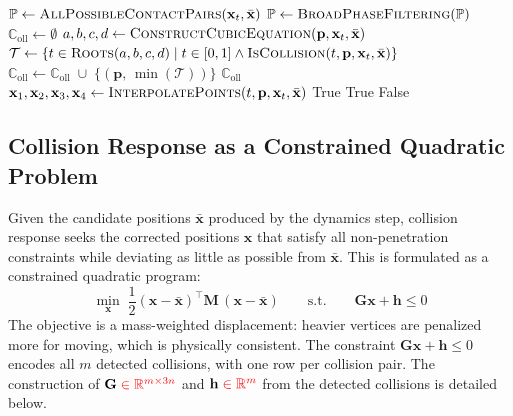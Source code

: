 \documentclass{article}
\newcommand{\red}[1]{\textcolor{red}{#1}}
\begin{document}
\begin{algorithm}[H]
\caption{Continuous Collision Detection: cubic root finding per candidate pair.}
\label{alg:CCD}
\begin{algorithmic}[1]
\addtolength{\itemsep}{0.5ex}
    \State $\mathbb{P} \gets \textsc{AllPossibleContactPairs}(\mathbf{x}_t, \bar{\mathbf{x}})$
    \State $\mathbb{P} \gets \textsc{BroadPhaseFiltering}(\mathbb{P})$
    \State $\mathbb{C}_{\text{oll}} \gets \emptyset$
        \State $a, b, c, d \gets \textsc{ConstructCubicEquation}(\mathbf{p}, \mathbf{x}_t, \bar{\mathbf{x}})$
        \State $\mathcal{T} \gets \{t \in \textsc{Roots}(a,b,c,d)\mid t \in [0, 1] \wedge \textsc{IsCollision}(t, \mathbf{p}, \mathbf{x}_t, \bar{\mathbf{x}})\}$
            \State $\mathbb{C}_{\text{oll}} \gets \mathbb{C}_{\text{oll}}\;\cup\; 
            \{(\mathbf{p},\,\min(\mathcal{T}))\}$
        \EndIf
    \EndFor
    \State \Return $\mathbb{C}_{\text{oll}}$
\EndFunction
\Statex
{}
    \State $\mathbf{x}_1, \mathbf{x}_2, \mathbf{x}_3, \mathbf{x}_4 \gets \textsc{InterpolatePoints}(t, \mathbf{p}, \mathbf{x}_t, \bar{\mathbf{x}})$
        \State \Return True
        \EndIf
        \State \Return True
        \EndIf
    \EndIf
    \State \Return False
\EndFunction
\end{algorithmic}
\end{algorithm}

\subsection{Collision Response as a Constrained Quadratic Problem}

Given the candidate positions $\bar{\mathbf{x}}$ produced by the dynamics step, collision response seeks the corrected positions $\mathbf{x}$ that satisfy all non-penetration constraints while deviating as little as possible from $\bar{\mathbf{x}}$. This is formulated as a constrained quadratic program:
\begin{equation}
    \min_{\mathbf{x}}\; \frac{1}{2}(\mathbf{x} - \bar{\mathbf{x}})^\top \mathbf{M}\, (\mathbf{x} - \bar{\mathbf{x}})
    \qquad 
    \text{s.t.}
    \qquad
    \mathbf{G}\mathbf{x}+\mathbf{h} \leq 0
\end{equation}
The objective is a mass-weighted displacement: heavier vertices are penalized more for moving, which is physically consistent. The constraint $\mathbf{G}\mathbf{x}+\mathbf{h} \leq 0$ encodes all $m$ detected collisions, with one row per collision pair. The construction of $\mathbf{G} \;\red{\in \mathbb{R}^{m \times 3n}}$ and $\mathbf{h} \;\red{\in \mathbb{R}^{m}}$ from the detected collisions is detailed below.
\end{document}
